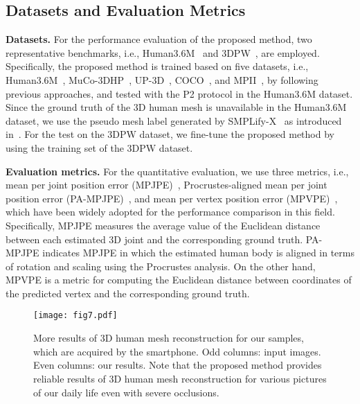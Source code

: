 \documentclass[10pt,twocolumn,letterpaper]{article}
\begin{document}
\subsection{Datasets and Evaluation Metrics}
\vspace{1mm}
\noindent\textbf{Datasets.} For the performance evaluation of the proposed method, two representative benchmarks, i.e., Human3.6M~\cite{Ionescu13} and 3DPW~\cite{Von2018}, are employed. Specifically, the proposed method is trained based on five datasets, i.e., Human3.6M~\cite{Ionescu13}, MuCo-3DHP~\cite{Mehta18}, UP-3D~\cite{Lassner17}, COCO~\cite{Lin14}, and MPII~\cite{Andriluka14}, by following previous approaches, and tested with the P2 protocol in the Human3.6M dataset. Since the ground truth of the 3D human mesh is unavailable in the Human3.6M dataset, we use the pseudo mesh label generated by SMPLify-X~\cite{Pavlakos19} as introduced in~\cite{Choi20, Moon2020, Lin21, Lin21_ICCV, Cho22}. For the test on the 3DPW dataset, we fine-tune the proposed method by using the training set of the 3DPW dataset.

\vspace{1mm}
\noindent\textbf{Evaluation metrics.} For the quantitative evaluation, we use three metrics, i.e., mean per joint position error (MPJPE)~\cite{Ionescu13}, Procrustes-aligned mean per joint position error (PA-MPJPE)~\cite{Zhou18}, and mean per vertex position error (MPVPE)~\cite{Pavlakos18}, which have been widely adopted for the performance comparison in this field. Specifically, MPJPE measures the average value of the Euclidean distance between each estimated 3D joint and the corresponding ground truth. PA-MPJPE indicates MPJPE in which the estimated human body is aligned in terms of rotation and scaling using the Procrustes analysis. On the other hand, MPVPE is a metric for computing the Euclidean distance between coordinates of the predicted vertex and the corresponding ground truth.


\begin{figure*}[t]
\vspace{-4mm}

\centerline{\texttt{[image: fig7.pdf]}}
\caption{\label{fig:more_examples}
More results of 3D human mesh reconstruction for our samples, which are acquired by the smartphone. Odd columns: input images. Even columns: our results. Note that the proposed method provides reliable results of 3D human mesh reconstruction for various pictures of our daily life even with severe occlusions.}
\end{figure*}
\end{document}
